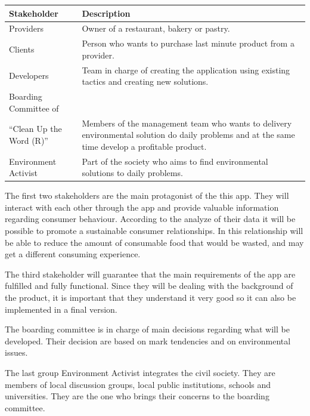\begin{table}[H]
    \begin{tabularx}{\textwidth}{lX}
    \toprule
    Stakeholder & Description   \\
    \midrule
    Providers & Owner of a restaurant, bakery or pastry. \\
    Clients & Person who wants to purchase last minute product from a provider. \\
    Developers & Team in charge of creating the application using existing tactics and creating new solutions. \\
    Boarding Committee of \\ ``Clean Up the Word (R)'' & Members of the management team who wants to delivery 
    environmental solution do daily problems and at the same time develop a profitable product.  \\
    Environment Activist & Part of the society who aims to find environmental solutions to daily problems. \\
    \bottomrule
    \end{tabularx}
\end{table}

The first two stakeholders are the main protagonist of the this app. They will interact with each other through the \gls{app}
and provide valuable information regarding consumer behaviour. According to the analyze of their data it will be possible 
to promote a sustainable consumer relationships. In this relationship  will be able to reduce the amount 
of consumable food that would be wasted, and  may get a different consuming experience.

The third stakeholder will guarantee that the main requirements of the app are fulfilled and fully functional. Since they will
be dealing with the background of the product, it is important that they understand it very good so it can also be implemented
in a final version.

The boarding committee is in charge of main decisions regarding what will be developed. Their decision are based on mark tendencies
and on environmental issues.

The last group Environment Activist integrates the civil society. They are members of local discussion groups, local public 
institutions, schools and universities. They are the one who brings their concerns to the boarding committee.